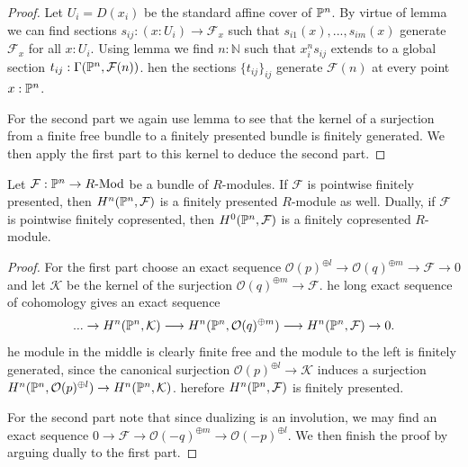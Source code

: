 \begin{proof}
  Let $U_i = D(x_i)$ be the standard affine cover of $\mathbb{P}^n$.
  By virtue of lemma  we can find sections $s_{ij} : (x:U_i) \to \mathcal F_x$ such that $s_{i1}(x), ..., s_{im}(x)$ generate $\mathcal F_x$ for all $x:U_i$.
  Using lemma  we find $n:\mathbb{N}$ such that $x_i^ns_{ij}$ extends to a global section $t_{ij}:\Gamma (\mathbb{P}^n,\mathcal F(n))$.
  hen the sections $\{t_{ij}\}_{ij}$ generate $\mathcal F(n)$ at every point $x:\mathbb{P}^n$.

  For the second part we again use lemma \cite[Chapter IV, 1.0 Lemma]{lombardi-quitte} to see that the kernel of a surjection from a finite free bundle to a finitely presented bundle is finitely generated.
  We then apply the first part to this kernel to deduce the second part.
\end{proof}

\begin{corollary}\label{top-cohomology-of-fp-bundle-is-fp}
  Let $\mathcal F: \mathbb{P}^n \to R\text{-}\mathrm{Mod}$ be a bundle of $R$-modules.
  If $\mathcal F$ is pointwise finitely presented, then $H^n(\mathbb{P}^n, \mathcal F)$ is a finitely presented $R$-module as well.
  Dually, if $\mathcal F$ is pointwise finitely copresented, then $H^0(\mathbb{P}^n, \mathcal F)$ is a finitely copresented $R$-module.
\end{corollary}

\begin{proof}
  For the first part choose an exact sequence $\mathcal O(p)^{\oplus l}\to \mathcal O(q)^{\oplus m}\to \mathcal F\to 0$ and let $\mathcal K$ be the kernel of the surjection $\mathcal O(q)^{\oplus m}\to \mathcal F$.
  he long exact sequence of cohomology gives an exact sequence
  \[
    ... \to H^n(\mathbb{P}^n,\mathcal K) \longrightarrow
    H^n(\mathbb{P}^n, \mathcal O(q)^{\oplus m}) \longrightarrow
    H^n(\mathbb{P}^n,\mathcal F) \to 0.
  \]
  he module in the middle is clearly finite free and the module to the left is finitely generated,  since the canonical surjection $\mathcal O(p)^{\oplus l} \to \mathcal K$ induces a surjection $H^n(\mathbb{P}^n, \mathcal O(p)^{\oplus l}) \to H^n(\mathbb{P}^n, \mathcal K)$.
  herefore $H^n(\mathbb{P}^n, \mathcal F)$ is finitely presented.

  For the second part note that since dualizing is an involution, we may find an exact sequence $0 \to \mathcal F \to \mathcal O(-q)^{\oplus m} \to \mathcal O(-p)^{\oplus l}$. We then finish the proof by arguing dually to the first part.
\end{proof}

